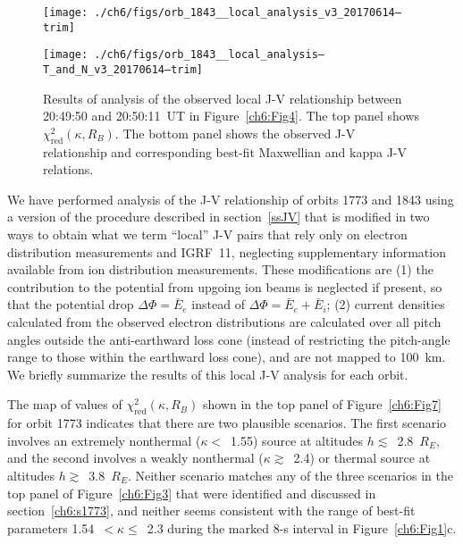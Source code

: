   

  \begin{figure}
    \centering

    \noindent\texttt{[image: ./ch6/figs/orb\_1843\_\_local\_analysis\_v3\_20170614--trim]}

    \vspace{1cm}

    \noindent\texttt{[image: ./ch6/figs/orb\_1843\_\_local\_analysis--T\_and\_N\_v3\_20170614--trim]}

    \caption[Orbit 1843: Reduced chi-squared values for local J-V relationship
    and corresponding best-fit curves.]{Results of analysis of the observed
      local J-V relationship between 20:49:50 and 20:50:11~UT in
      Figure~\ref{ch6:Fig4}. The top panel shows
      $\chi^2_{\mathrm{red}} ( \kappa, R_B)$. The bottom panel shows the
      observed J-V relationship and corresponding best-fit Maxwellian and kappa
      J-V relations.}
    \label{ch6:Fig8}
  \end{figure}


  We have performed analysis of the J-V relationship of orbits 1773 and 1843
  using a version of the procedure described in section~\ref{ssJV} that is
  modified in two ways to obtain what we term ``local'' J-V pairs that rely only
  on electron distribution measurements and IGRF~11, neglecting supplementary
  information available from ion distribution measurements. These modifications
  are (1) the contribution to the potential from upgoing ion beams is neglected
  if present, so that the potential drop $\Delta \Phi = \bar{E}_e$ instead of
  $\Delta \Phi = \bar{E}_e + \bar{E}_i$; (2) current densities calculated from
  the observed electron distributions are calculated over all pitch angles
  outside the anti-earthward loss cone (instead of restricting the pitch-angle
  range to those within the earthward loss cone), and are not mapped to
  100~km. We briefly summarize the results of this local J-V analysis for each
  orbit.

  The map of values of $\chi^2_{\mathrm{red}} (\kappa, R_B)$ shown in the top
  panel of Figure~\ref{ch6:Fig7} for orbit 1773 indicates that there are two
  plausible scenarios. The first scenario involves an extremely nonthermal
  ($\kappa <$~1.55) source at altitudes $h \lesssim$~2.8~$R_E$, and the second
  involves a weakly nonthermal ($\kappa \gtrsim$~2.4) or thermal source at
  altitudes $h \gtrsim$~3.8~$R_E$. Neither scenario matches any of the three
  scenarios in the top panel of Figure~\ref{ch6:Fig3} that were identified and
  discussed in section~\ref{ch6:s1773}, and neither seems consistent with the
  range of best-fit parameters 1.54~$< \kappa \leq$~2.3 during the marked 8-s
  interval in Figure~\ref{ch6:Fig1}c.

